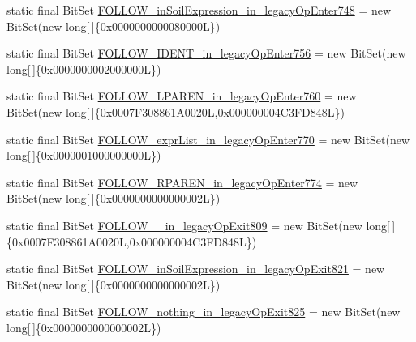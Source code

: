 \begin{DoxyCompactItemize}
\item 
static final Bit\-Set \hyperlink{classorg_1_1tzi_1_1use_1_1parser_1_1shell_1_1_shell_command_parser_a92e3c15b8fff0bc5a5c1a8a10d6b8e94}{F\-O\-L\-L\-O\-W\-\_\-in\-Soil\-Expression\-\_\-in\-\_\-legacy\-Op\-Enter748} = new Bit\-Set(new long\mbox{[}$\,$\mbox{]}\{0x0000000000080000\-L\})
\item 
static final Bit\-Set \hyperlink{classorg_1_1tzi_1_1use_1_1parser_1_1shell_1_1_shell_command_parser_a43d01951b5ca5b1fd16ecfec09fb9e5d}{F\-O\-L\-L\-O\-W\-\_\-\-I\-D\-E\-N\-T\-\_\-in\-\_\-legacy\-Op\-Enter756} = new Bit\-Set(new long\mbox{[}$\,$\mbox{]}\{0x0000000002000000\-L\})
\item 
static final Bit\-Set \hyperlink{classorg_1_1tzi_1_1use_1_1parser_1_1shell_1_1_shell_command_parser_aeeffa911a0a71310581bfae37c267ccf}{F\-O\-L\-L\-O\-W\-\_\-\-L\-P\-A\-R\-E\-N\-\_\-in\-\_\-legacy\-Op\-Enter760} = new Bit\-Set(new long\mbox{[}$\,$\mbox{]}\{0x0007\-F308861\-A0020\-L,0x000000004\-C3\-F\-D848\-L\})
\item 
static final Bit\-Set \hyperlink{classorg_1_1tzi_1_1use_1_1parser_1_1shell_1_1_shell_command_parser_a527c5e3a28d8e52f1d99a5e08d38ebcb}{F\-O\-L\-L\-O\-W\-\_\-expr\-List\-\_\-in\-\_\-legacy\-Op\-Enter770} = new Bit\-Set(new long\mbox{[}$\,$\mbox{]}\{0x0000001000000000\-L\})
\item 
static final Bit\-Set \hyperlink{classorg_1_1tzi_1_1use_1_1parser_1_1shell_1_1_shell_command_parser_a35dda13bd18a7a03c20060f3e9312901}{F\-O\-L\-L\-O\-W\-\_\-\-R\-P\-A\-R\-E\-N\-\_\-in\-\_\-legacy\-Op\-Enter774} = new Bit\-Set(new long\mbox{[}$\,$\mbox{]}\{0x0000000000000002\-L\})
\item 
static final Bit\-Set \hyperlink{classorg_1_1tzi_1_1use_1_1parser_1_1shell_1_1_shell_command_parser_a8ec41bb762d79c0ecf141bb76e3f1f3c}{F\-O\-L\-L\-O\-W\-\_\-\_\-in\-\_\-legacy\-Op\-Exit809} = new Bit\-Set(new long\mbox{[}$\,$\mbox{]}\{0x0007\-F308861\-A0020\-L,0x000000004\-C3\-F\-D848\-L\})
\item 
static final Bit\-Set \hyperlink{classorg_1_1tzi_1_1use_1_1parser_1_1shell_1_1_shell_command_parser_a5b0969f1280f2f3c04bf2604af19e844}{F\-O\-L\-L\-O\-W\-\_\-in\-Soil\-Expression\-\_\-in\-\_\-legacy\-Op\-Exit821} = new Bit\-Set(new long\mbox{[}$\,$\mbox{]}\{0x0000000000000002\-L\})
\item 
static final Bit\-Set \hyperlink{classorg_1_1tzi_1_1use_1_1parser_1_1shell_1_1_shell_command_parser_a22d8698b52bea5b54602ba3da1b83a19}{F\-O\-L\-L\-O\-W\-\_\-nothing\-\_\-in\-\_\-legacy\-Op\-Exit825} = new Bit\-Set(new long\mbox{[}$\,$\mbox{]}\{0x0000000000000002\-L\})

\end{DoxyCompactItemize}
